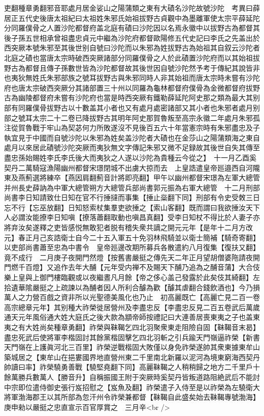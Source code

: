 吏翻種章勇翻邪音耶處月居金娑山之陽蒲類之東有大磧名沙陀故號沙陀　考異曰薛居正五代史後唐太祖紀曰太祖姓朱邪氏始祖拔野古貞觀中為墨離軍使太宗平薛延陀分同羅僕骨之人置沙陀都督府盖北庭有磧曰沙陀因以名焉永徽中以拔野古為都督其後子孫五世相承曾祖盡忠貞元中繼為沙陀府都督歐陽修五代史記曰李氏之先盖出於西突厥本號朱邪至其後世别自號曰沙陀而以朱邪為姓拔野古為始祖其自叙云沙陀者北庭之磧也當唐太宗時破西突厥諸部分同羅僕骨之人於此磧置沙陀府而以其始祖拔野古為都督且傳子孫數世皆為沙陀都督故其後世因自號沙陀然予考于傳紀其說皆非也夷狄無姓氏朱邪部族之號耳拔野古與朱邪同時人非其始祖而唐太宗時未嘗有沙陀府也唐太宗破西突厥分其諸部置三十州以同羅為龜林都督府僕骨為金微都督府拔野古為幽陵都督府未嘗有沙陀府也當是時西突厥有鐵勒薛延陀阿史那之類為最大其别部有同羅僕骨拔野古以十數盖其小者也又有處月處密諸部又其小者也朱邪者處月别部之號耳太宗二十二卷已降拔野古其明年阿史那賀魯叛至高宗永徽二年處月朱邪孤注從賀魯戰于牢山為契苾何力所敗遂沒不見後百五六十年當憲宗時有朱邪盡忠及子執宜見于中國而自號沙陀以朱邪為姓矣盖沙陀者大磧也在金莎山之陽蒲類海之東自處月以來居此磧號沙陀突厥而夷狄無文字傳記朱邪又微不足録故其後世自失其傳至盡忠孫始賜姓李氏李氏後大而夷狄之人遂以沙陀為貴種云今從之】　十一月乙酉奚契丹二萬騎寇漁陽幽州都督宋璟閉城不出虜大掠而去　上皇誥遣皇帝廵邉西自河隴東及燕薊選將練卒【燕因肩翻薊音計將即亮翻】甲午以幽州都督宋璟為左軍大總管并州長史薛訥為中軍大總管朔方大總管兵部尚書郭元振為右軍大總管　十二月刑部尚書李日知請致仕日知在官不行捶撻而事集【捶止橤翻下同】刑部有令史受敇三日忘不行【忘巫放翻】日知怒索杖集羣吏欲捶之【索山客翻】既而謂曰我欲捶汝天下人必謂汝能撩李日知嗔【撩落蕭翻取動也嗔昌真翻】受李日知杖不得比於人妻子亦將弃汝矣遂釋之吏皆感悦無敢犯者脱有稽失衆共謫之開元元年【是年十二月方改元】春正月己亥誥衛士自今二十五入軍五十免羽林飛騎並以衛士簡補【騎奇寄翻】　以吏部尚書蕭至忠為中書令　皇帝廵邊改期所募兵各散遣約八月復集【復扶又翻】竟不成行　二月庚子夜開門然燈【按舊書嚴挺之傳先天二年正月望胡僧婆陁請夜開門燃千百燈】又追作去年大酺【元年受内禅不及賜天下酺乃追為之酺音蒲】大合伎樂上皇與上御門樓臨觀或以夜繼晝凡月餘【帝之侈心盖己發露於此矣伎其綺翻】左拾遺華隂嚴挺之上疏諫以為酺者因人所利合醵為歡【醵其虐翻合錢飲酒也】今乃損萬人之力營百戲之資非所以光聖德美風化也乃止　初高麗既亡【高麗亡見二百一卷高宗總章元年】其别種大祚榮徙居營州及李盡忠反【李盡忠反見二百五卷武后萬歲通天元年風俗通大姓大庭氏之後大款為顓帝師按禮記曰大連善居喪東夷之子也盖東夷之有大姓尚矣種章勇翻】祚榮與靺鞨乞四北羽聚衆東走阻險自固【靺鞨音末曷】盡忠死武后使將軍李楷固討其餘黨楷固擊乞四北羽斬之引兵踰天門嶺逼祚榮【新書天門嶺在上護眞河北三百里】祚榮逆戰楷固大敗僅以身免祚榮遂帥其衆東據東牟山築城居之【東牟山在挹婁國界地直營州東二千里南北新羅以泥河為境東窮海西契丹帥讀曰率】祚榮驍勇善戰【驍堅堯翻下同】高麗靺鞨之人稍稍歸之地方二千里戶十餘萬勝兵數萬人【勝音升】自稱振國王附于突厥時奚契丹皆叛道路阻絶武后不能討中宗即位遣侍御史張行岌招慰之【岌魚及翻】祚榮遣子入侍至是以祚榮為左驍衛大將軍渤海郡王以其所部為忽汗州令祚榮兼都督【靺鞨自此盛矣始去靺鞨專號渤海】庚申勑以嚴挺之忠直宣示百官厚賞之　三月辛<br />
